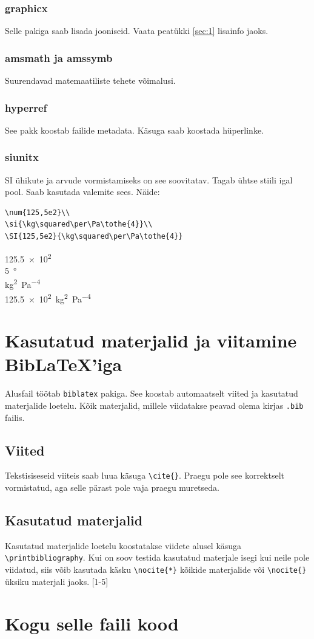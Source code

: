 \documentclass{trkut}%
\begin{document}
\subsection{\textsf{graphicx}}
Selle pakiga saab lisada jooniseid. Vaata peatükki \ref{sec:1} lisainfo jaoks.
\subsection{\textsf{amsmath} ja \textsf{amssymb}}
Suurendavad matemaatiliste tehete võimalusi.
\subsection{\textsf{hyperref}}
See pakk koostab  failide metadata. Käsuga \url{} saab koostada hüperlinke.
\subsection{\textsf{siunitx}}
SI ühikute ja arvude vormistamiseks on see soovitatav. Tagab ühtse stiili igal pool. Saab kasutada valemite sees. Näide:
\begin{verbatim}
\num{125,5e2}\\
\si{\kg\squared\per\Pa\tothe{4}}\\
\SI{125,5e2}{\kg\squared\per\Pa\tothe{4}}
\end{verbatim}
\num{125,5e2}\\
\SI{5}{\degree}\\
\si{\kg\squared\per\Pa\tothe{4}}\\
\SI{125,5e2}{\kg\squared\per\Pa\tothe{4}}


\chapter{Kasutatud materjalid ja viitamine BibLaTeX'iga}
Alusfail töötab \verb!biblatex! pakiga. See koostab automaatselt viited ja kasutatud materjalide loetelu. Kõik materjalid, millele viidatakse peavad olema kirjas \verb!.bib! failis. 

\section{Viited}
Tekstisiseseid viiteis saab luua käsuga \verb!\cite{}!. Praegu pole see korrektselt vormistatud, aga selle pärast pole vaja praegu muretseda. \cite{palma15}

\section{Kasutatud materjalid}
Kasutatud materjalide loetelu koostatakse viidete alusel käsuga \verb!\printbibliography!. Kui on soov testida kasutatud materjale isegi kui neile pole viidatud, siis võib kasutada käsku \verb!\nocite{*}! kõikide materjalide või \verb!\nocite{}! üksiku materjali jaoks. \cite{palma15}[1-5]


\nocite{*}
\printbibliography

\appendix

\chapter{Kogu selle faili kood}
\tiny

\normalsize

\kinnitusleht
\end{document}
